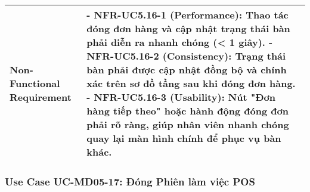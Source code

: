 \begin{longtable}{|m{4cm}|p{11cm}|}
\hline
Non-Functional Requirement & - \textbf{NFR-UC5.16-1 (Performance):} Thao tác đóng đơn hàng và cập nhật trạng thái bàn phải diễn ra nhanh chóng (< 1 giây). \newline - \textbf{NFR-UC5.16-2 (Consistency):} Trạng thái bàn phải được cập nhật đồng bộ và chính xác trên sơ đồ tầng sau khi đóng đơn hàng. \newline - \textbf{NFR-UC5.16-3 (Usability):} Nút "Đơn hàng tiếp theo" hoặc hành động đóng đơn phải rõ ràng, giúp nhân viên nhanh chóng quay lại màn hình chính để phục vụ bàn khác. \\
\hline
\end{longtable}

\subsubsection{Use Case UC-MD05-17: Đóng Phiên làm việc POS}

